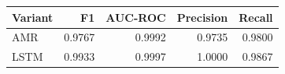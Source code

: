 \begin{tabular}{lrrrr}
\toprule
Variant & F1 & AUC-ROC & Precision & Recall \\
\midrule
AMR & 0.9767 & 0.9992 & 0.9735 & 0.9800 \\
LSTM & 0.9933 & 0.9997 & 1.0000 & 0.9867 \\
\bottomrule
\end{tabular}
